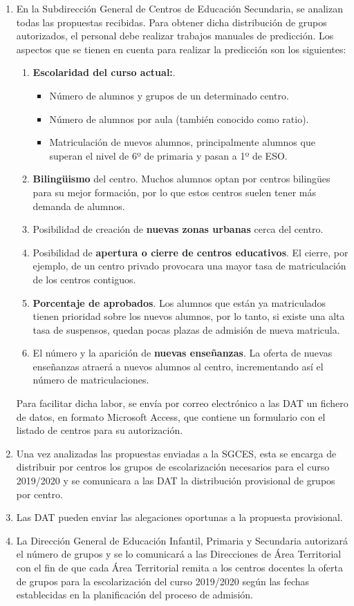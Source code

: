 \begin{enumerate}
	
	\item En la Subdirección General de Centros de Educación Secundaria, se analizan todas las propuestas recibidas. Para obtener dicha distribución de grupos autorizados, el personal debe realizar trabajos manuales de predicción. Los aspectos que se tienen en cuenta para realizar la predicción son los siguientes:
	\begin{enumerate}
		\item \textbf{Escolaridad del curso actual:}.
		\begin{itemize}
			\item Número de alumnos y grupos de un determinado centro.
			\item Número de alumnos por aula (también conocido como ratio).
			\item Matriculación de nuevos alumnos, principalmente alumnos que superan el nivel de 6º de primaria y pasan a 1º de ESO.
		\end{itemize}	
		\item \textbf{Bilingüismo} del centro. Muchos alumnos optan por centros bilingües para su mejor formación, por lo que estos centros suelen tener más demanda de alumnos.
		\item Posibilidad de creación de \textbf{nuevas zonas urbanas} cerca del centro. 
		\item Posibilidad de \textbf{apertura o cierre de centros educativos}. El cierre, por ejemplo, de un centro privado provocara una mayor tasa de matriculación de los centros contiguos. 
		\item \textbf{Porcentaje de aprobados}. Los alumnos que están ya matriculados tienen prioridad sobre los nuevos alumnos, por lo tanto, si existe una alta tasa de suspensos, quedan pocas plazas de admisión de nueva matricula.
		\item El número y la aparición de \textbf{nuevas enseñanzas}. La oferta de nuevas enseñanzas atraerá a nuevos alumnos al centro, incrementando así el número de matriculaciones.
	\end{enumerate}
	
	Para facilitar dicha labor, se envía por correo electrónico a las DAT un fichero de datos, en formato Microsoft Access, que contiene un formulario con el listado de centros para su autorización.
	\item Una vez analizadas las propuestas enviadas a la SGCES, esta se encarga de distribuir por centros los grupos de escolarización necesarios para el curso 2019/2020 y se comunicara a las DAT la distribución provisional de grupos por centro.
	\item Las DAT pueden enviar las alegaciones oportunas a la propuesta provisional.
	\item La Dirección General de Educación Infantil, Primaria y Secundaria autorizará el número de grupos y se lo comunicará a las Direcciones de Área Territorial  con el fin de que cada Área Territorial remita a los centros docentes la oferta de grupos para la escolarización del curso 2019/2020 según las fechas establecidas en la planificación del proceso de admisión. 
	

\end{enumerate}
